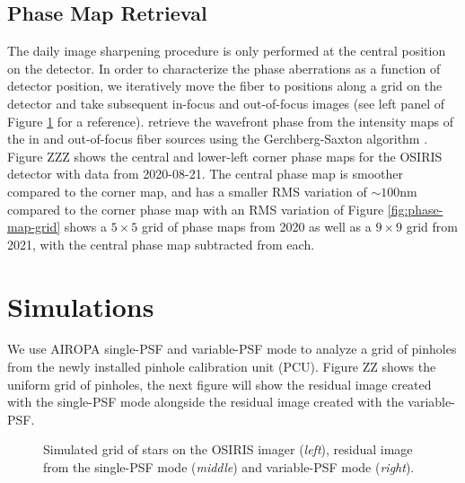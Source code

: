 \documentclass[]{spie}  %
\begin{document}
\subsection{Phase Map Retrieval} \label{subsec:phase-map-retrieval}
\indent The daily image sharpening procedure is only performed at the central position on the detector. In order to characterize the phase aberrations as a function of detector position, we iteratively move the fiber to positions along a grid on the detector and take subsequent in-focus and out-of-focus images (see left panel of Figure \ref{fig:grid_stars} for a reference). retrieve the wavefront phase from the intensity maps of the in and out-of-focus fiber sources using the Gerchberg-Saxton algorithm \cite{gerchberg:1972a}. Figure ZZZ shows the central and lower-left corner phase maps for the OSIRIS detector with data from 2020-08-21. The central phase map is smoother compared to the corner map, and has a smaller RMS variation of ${\sim}100$nm compared to the corner phase map with an RMS variation of  Figure \ref{fig:phase-map-grid} shows a $5\times5$ grid of phase maps from 2020 as well as a $9\times9$ grid from 2021, with the central phase map subtracted from each.

\section{Simulations} \label{sec:simulations}
We use AIROPA single-PSF and variable-PSF mode to analyze a grid of pinholes from the newly installed pinhole calibration unit (PCU). Figure ZZ shows the uniform grid of pinholes, the next figure will show the residual image created with the single-PSF mode alongside the residual image created with the variable-PSF.

\begin{figure}[!h]
 \caption{\footnotesize Simulated grid of stars on the OSIRIS imager (\textit{left}), residual image from the single-PSF mode (\textit{middle}) and variable-PSF mode (\textit{right}). \label{fig:grid_stars}}
\end{figure}
\end{document}
